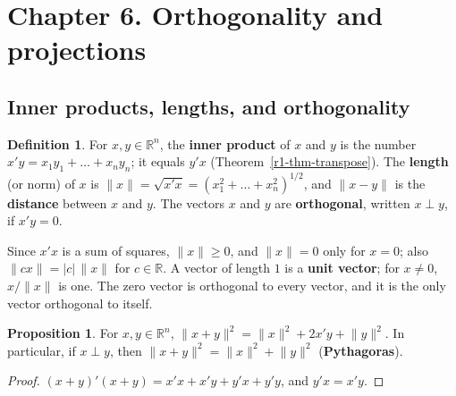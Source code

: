 \documentclass[12pt]{article}
\newcommand{\R}{\mathbb R}
\theoremstyle{definition}
\newtheorem{proposition}[theorem]{Proposition}
\newtheorem{definition}[theorem]{Definition}
\begin{document}
\section*{Chapter 6. Orthogonality and projections}

\subsection*{Inner products, lengths, and orthogonality}

\begin{definition}\label{r6-def-inner}
For \(x,y\in\R^n\), the \textbf{inner product} of \(x\) and \(y\) is the number
\(x'y=x_1y_1+\dots+x_ny_n\); it equals \(y'x\) (Theorem~\ref{r1-thm-transpose}). The \textbf{length}
(or norm) of \(x\) is \(\lVert x\rVert=\sqrt{x'x}=(x_1^2+\dots+x_n^2)^{1/2}\), and \(\lVert x-y\rVert\) is the
\textbf{distance} between \(x\) and \(y\). The vectors \(x\) and \(y\) are \textbf{orthogonal}, written
\(x\perp y\), if \(x'y=0\).
\end{definition}
Since \(x'x\) is a sum of squares, \(\lVert x\rVert\geqslant0\), and \(\lVert x\rVert=0\) only for \(x=0\); also
\(\lVert cx\rVert=\lvert c\rvert\,\lVert x\rVert\) for \(c\in\R\). A vector of length \(1\) is a \textbf{unit vector};
for \(x\ne0\), \(x/\lVert x\rVert\) is one. The zero vector is orthogonal to every vector, and it is the only
vector orthogonal to itself.

\begin{proposition}\label{r6-prop-pythagoras}
For \(x,y\in\R^n\), \(\lVert x+y\rVert^2=\lVert x\rVert^2+2x'y+\lVert y\rVert^2\). In particular, if \(x\perp y\), then
\(\lVert x+y\rVert^2=\lVert x\rVert^2+\lVert y\rVert^2\) (\textbf{Pythagoras}).
\end{proposition}
\begin{proof}
\((x+y)'(x+y)=x'x+x'y+y'x+y'y\), and \(y'x=x'y\).
\end{proof}
\end{document}
